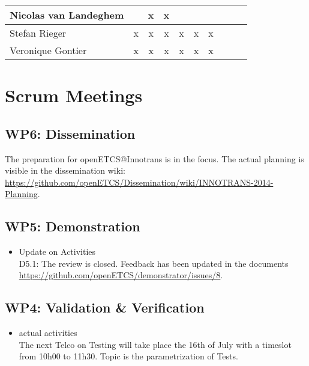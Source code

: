 \documentclass[a4paper, 11pt]{article}
\begin{document}
\begin{tabular}{|l|c|c|c||c|c|c||c|c|c|}
Nicolas van Landeghem&   & x & x &   &   &   \\\hline
Stefan Rieger        & x & x & x & x & x & x \\\hline
Veronique Gontier    & x & x & x & x & x & x \\\hline
\end{tabular}


\section{Scrum Meetings}

\subsection{WP6: Dissemination}

The preparation for openETCS@Innotrans is in the focus. The actual planning is visible in the dissemination wiki: \url{https://github.com/openETCS/Dissemination/wiki/INNOTRANS-2014-Planning}.

\subsection{WP5: Demonstration}
\begin{itemize}
\item Update on Activities\\

D5.1: The review is closed. Feedback has been updated in the documents \url{https://github.com/openETCS/demonstrator/issues/8}.

\end{itemize}


\subsection{WP4: Validation \& Verification}
\begin{itemize}
\item actual activities\\

The next Telco on Testing will take place the 16th of July with a timeslot from 10h00 to 11h30. Topic is the parametrization of Tests.

\end{itemize}
\end{document}
